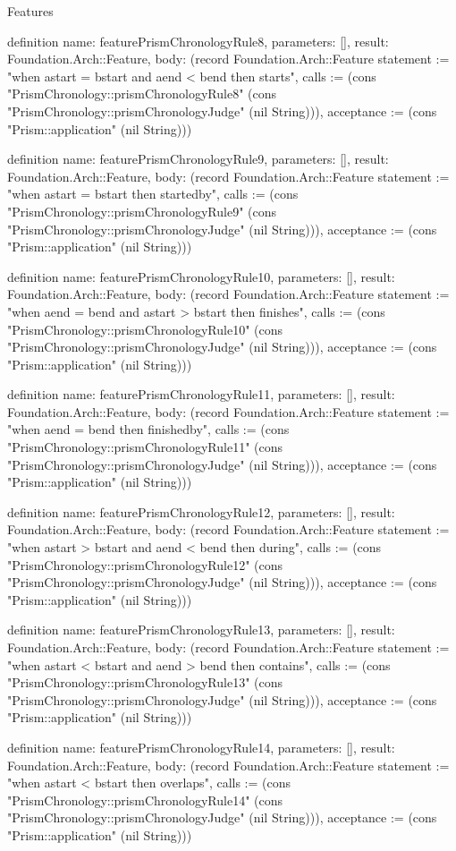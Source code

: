 \begin{lexlean}{Features}
\begin{semanticmodule}
definition{
  name: featurePrismChronologyRule8,
  parameters: [],
  result: Foundation.Arch::Feature,
  body: (record Foundation.Arch::Feature {statement := "when astart = bstart and aend < bend then starts", calls := (cons "PrismChronology::prismChronologyRule8" (cons "PrismChronology::prismChronologyJudge" (nil String))), acceptance := (cons "Prism::application" (nil String))})
}

definition{
  name: featurePrismChronologyRule9,
  parameters: [],
  result: Foundation.Arch::Feature,
  body: (record Foundation.Arch::Feature {statement := "when astart = bstart then startedby", calls := (cons "PrismChronology::prismChronologyRule9" (cons "PrismChronology::prismChronologyJudge" (nil String))), acceptance := (cons "Prism::application" (nil String))})
}

definition{
  name: featurePrismChronologyRule10,
  parameters: [],
  result: Foundation.Arch::Feature,
  body: (record Foundation.Arch::Feature {statement := "when aend = bend and astart > bstart then finishes", calls := (cons "PrismChronology::prismChronologyRule10" (cons "PrismChronology::prismChronologyJudge" (nil String))), acceptance := (cons "Prism::application" (nil String))})
}

definition{
  name: featurePrismChronologyRule11,
  parameters: [],
  result: Foundation.Arch::Feature,
  body: (record Foundation.Arch::Feature {statement := "when aend = bend then finishedby", calls := (cons "PrismChronology::prismChronologyRule11" (cons "PrismChronology::prismChronologyJudge" (nil String))), acceptance := (cons "Prism::application" (nil String))})
}

definition{
  name: featurePrismChronologyRule12,
  parameters: [],
  result: Foundation.Arch::Feature,
  body: (record Foundation.Arch::Feature {statement := "when astart > bstart and aend < bend then during", calls := (cons "PrismChronology::prismChronologyRule12" (cons "PrismChronology::prismChronologyJudge" (nil String))), acceptance := (cons "Prism::application" (nil String))})
}

definition{
  name: featurePrismChronologyRule13,
  parameters: [],
  result: Foundation.Arch::Feature,
  body: (record Foundation.Arch::Feature {statement := "when astart < bstart and aend > bend then contains", calls := (cons "PrismChronology::prismChronologyRule13" (cons "PrismChronology::prismChronologyJudge" (nil String))), acceptance := (cons "Prism::application" (nil String))})
}

definition{
  name: featurePrismChronologyRule14,
  parameters: [],
  result: Foundation.Arch::Feature,
  body: (record Foundation.Arch::Feature {statement := "when astart < bstart then overlaps", calls := (cons "PrismChronology::prismChronologyRule14" (cons "PrismChronology::prismChronologyJudge" (nil String))), acceptance := (cons "Prism::application" (nil String))})
}


\end{semanticmodule}
\end{lexlean}
